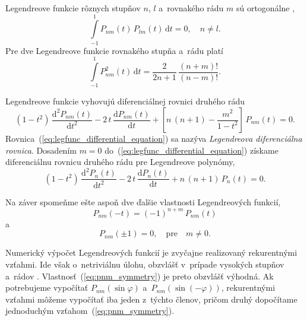 \documentclass[a4paper,12pt]{book}
\newcommand{\diff}{\mathrm d}
\begin{document}
Legendreove funkcie rôznych stupňov $n$, $l$ a~rovnakého rádu $m$ sú
ortogonálne \parencite{Freeden2009},
%
\begin{equation}
\label{eq:pnm_orthogonality}
\int\limits_{-1}^{1} P_{nm}(t) \, P_{lm}(t) \, \diff t = 0{,} \quad n \neq l{.}
\end{equation}
%
Pre dve Legendreove funkcie rovnakého stupňa a~rádu platí
\begin{equation}
\label{eq:pnm_times_pnm}
\int\limits_{-1}^{1} P^2_{nm}(t) \, \diff t = \frac{2}{2n + 1} \, \frac{(n 
+ m)!}{(n - m)!}{.}
\end{equation}

Legendreove funkcie vyhovujú diferenciálnej rovnici druhého rádu 
\parencite{SansoGeoidDetermination}
%
\begin{equation}
\label{eq:legfunc_differential_equation}
(1 - t^2) \, \frac{\diff^2 P_{nm}(t)}{\diff t^2} - 2 \, t \, \frac{\diff 
P_{nm}(t)}{\diff t} + \left[ n \, (n + 1) - \frac{m^2}{1 - t^2} \right] \, 
P_{nm}(t) = 0{.}
\end{equation}
%
Rovnica~(\ref{eq:legfunc_differential_equation}) sa nazýva \emph{Legendreova 
diferenciálna rovnica}.  Dosadením $m = 0$ 
do~(\ref{eq:legfunc_differential_equation}) získame diferenciálnu rovnicu 
druhého rádu pre Legendreove polynómy,
%
\begin{equation}
\label{eq:legpol_differential_equation}
(1 - t^2) \, \frac{\diff^2 P_n(t)}{\diff t^2} - 2 \, t \, \frac{\diff 
P_n(t)}{\diff t} + n \, (n + 1) \, P_n(t) = 0{.}
\end{equation}

Na záver spomeňme ešte aspoň dve ďalšie vlastnosti Legendreových funkcií,
%
\begin{equation}
\label{eq:pnm_symmetry}
P_{nm}(-t) = (-1)^{n + m} \, P_{nm}(t)
\end{equation}
%
a
%
\begin{equation}
P_{nm}(\pm1) = 0{,} \quad \text{pre} \quad m \neq 0{.}
\end{equation}

Numerický výpočet Legendreových funkcií je zvyčajne realizovaný rekurentnými 
vzťahmi.  Ide však o~netriviálnu úlohu, obzvlášť v~prípade vysokých stupňov 
a~rádov \parencite{Holmes2002a,Fukushima2012a}.  
Vlastnosť~(\ref{eq:pnm_symmetry}) je preto obzvlášť výhodná.  Ak potrebujeme 
vypočítať $P_{nm}(\sin\varphi)$ a~$P_{nm}(\sin(-\varphi))$, rekurentnými 
vzťahmi môžeme vypočítať iba jeden z~týchto členov, pričom druhý dopočítame 
jednoduchým vzťahom~(\ref{eq:pnm_symmetry}).
\end{document}
